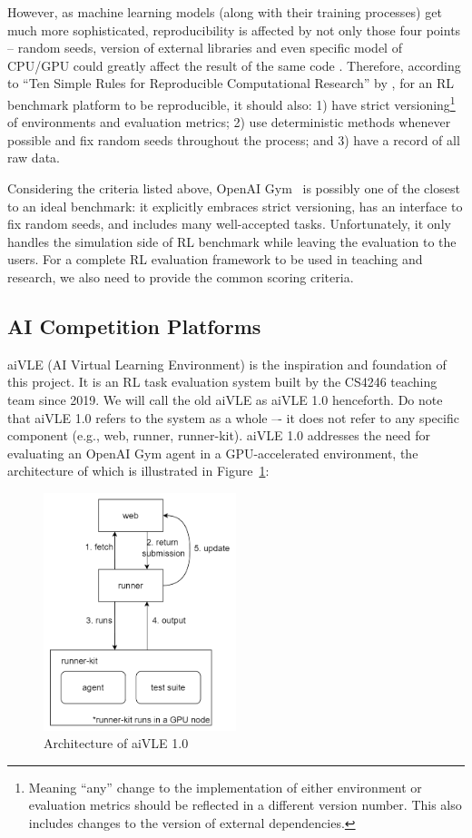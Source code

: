 However, as machine learning models (along with their training processes) get much more sophisticated, reproducibility is affected by not only those four points – random seeds, version of external libraries and even specific model of CPU/GPU could greatly affect the result of the same code \parencite{RN21}. Therefore, according to ``Ten Simple Rules for Reproducible Computational Research'' by \parencite{RN22}, for an RL benchmark platform to be reproducible, it should also: 1) have strict versioning\footnote{Meaning ``any'' change to the implementation of either environment or evaluation metrics should be reflected in a different version number. This also includes changes to the version of external dependencies.} of environments and evaluation metrics; 2) use deterministic methods whenever possible and fix random seeds throughout the process; and 3) have a record of all raw data.

Considering the criteria listed above, OpenAI Gym~\parencite{openai-gym} is possibly one of the closest to an ideal benchmark: it explicitly embraces strict versioning, has an interface to fix random seeds, and includes many well-accepted tasks. Unfortunately, it only handles the simulation side of RL benchmark while leaving the evaluation to the users. For a complete RL evaluation framework to be used in teaching and research, we also need to provide the common scoring criteria.

\subsection{AI Competition Platforms}
\label{ch:literature-review-related-work-ai-competition-platforms}
aiVLE (AI Virtual Learning Environment) is the inspiration and foundation of this project. It is an RL task evaluation system built by the CS4246 teaching team since 2019. We will call the old aiVLE as aiVLE 1.0 henceforth. Do note that aiVLE 1.0 refers to the system as a whole –- it does not refer to any specific component (e.g., web, runner, runner-kit). aiVLE 1.0 addresses the need for evaluating an OpenAI Gym agent in a GPU-accelerated environment, the architecture of which is illustrated in Figure~\ref{fig:aivle-1-arch}:

\begin{figure}[H]
    \centering
    \includegraphics[width=0.5\textwidth]{images/aivle_1_arch.png}
    \caption{Architecture of aiVLE 1.0}
    \label{fig:aivle-1-arch}
\end{figure}

